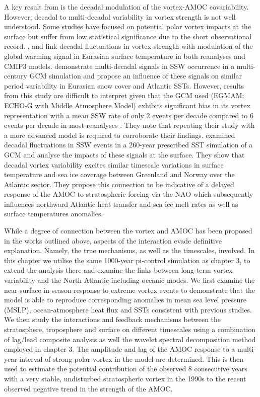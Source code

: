 A key result from \cite{reichlerStratospheric2012b} is the decadal modulation of the vortex-AMOC covariability. However, decadal to multi-decadal variability in vortex strength is not well understood. Some studies have focused on potential polar vortex impacts at the surface but suffer from low statistical significance due to the short observational record. \cite{garfinkelStratospheric2017b}, \cite{garfinkelEffect2015b} and \cite{cohenDecadal2009b} link decadal fluctuations in vortex strength with modulation of the global warming signal in Eurasian surface temperature in both reanalyses and CMIP3 models. \cite{schimankeMultidecadal2011b} demonstrate multi-decadal signals in SSW occurrence in a multi-century GCM simulation and propose an influence of these signals on similar period variability in Eurasian snow cover and Atlantic SSTs. However, results from this study are difficult to interpret given that the GCM used (EGMAM: ECHO‐G with Middle Atmosphere Model) exhibits significant bias in its vortex representation with a mean SSW rate of only 2 events per decade compared to 6 events per decade in most reanalyses \citep{ayarzaguenaRepresentation2019a}. They note that repeating their study with a more advanced model is required to corroborate their findings. \cite{manziniStratospheretroposphere2012b} examined decadal fluctuations in SSW events in a 260-year prescribed SST simulation of a GCM and analyse the impacts of these signals at the surface. They show that decadal vortex variability excites similar timescale variations in surface temperature and sea ice coverage between Greenland and Norway over the Atlantic sector. They propose this connection to be indicative of a delayed response of the AMOC to stratospheric forcing via the NAO which  subsequently influences northward Atlantic heat transfer and sea ice melt rates as well as surface temperatures anomalies. 

While a degree of connection between the vortex and AMOC has been proposed in the works outlined above, aspects of the interaction evade definitive explanation. Namely, the true mechanisms, as well as the timescales, involved. In this chapter we utilise the same 1000-year pi-control simulation as chapter 3, to extend the analysis there and examine the links between long-term vortex variability and the North Atlantic including oceanic modes. We first examine the near-surface in-season response to extreme vortex events to demonstrate that the model is able to reproduce corresponding anomalies in mean sea level pressure (MSLP), ocean-atmosphere heat flux and SSTs consistent with previous studies. We then study the interactions and feedback mechanisms between the stratosphere, troposphere and surface on different timescales using a combination of lag/lead composite analysis as well the wavelet spectral decomposition method employed in chapter 3. The amplitude and lag of the AMOC response to a multi-year interval of strong polar vortex in the model are determined. This is then used to estimate the potential contribution of the observed 8 consecutive years with a very stable, undisturbed stratospheric vortex in the 1990s \citep{pawsonCold1999b} to the recent observed negative trend in the strength of the AMOC.

